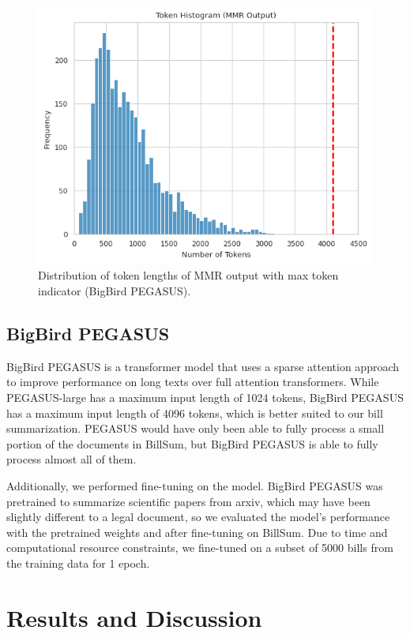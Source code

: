 \documentclass[11pt]{article}
\begin{document}
\begin{figure}[ht]
  \centering
  \includegraphics[width=\columnwidth]{token_distr_shortened.png}  %
  \caption{Distribution of token lengths of MMR output with max token indicator (BigBird PEGASUS).}
  \label{fig:token_distr_short}
\end{figure}

\subsection{BigBird PEGASUS}

BigBird PEGASUS is a transformer model that uses a sparse attention approach to improve performance on long texts over full attention transformers. While PEGASUS-large has a maximum input length of 1024 tokens, BigBird PEGASUS has a maximum input length of 4096 tokens, which is better suited to our bill summarization. PEGASUS would have only been able to fully process a small portion of the documents in BillSum, but BigBird PEGASUS is able to fully process almost all of them. 

Additionally, we performed fine-tuning on the model. BigBird PEGASUS was pretrained to summarize scientific papers from arxiv, which may have been slightly different to a legal document, so we evaluated the model's performance with the pretrained weights and after fine-tuning on BillSum. Due to time and computational resource constraints, we fine-tuned on a subset of 5000 bills from the training data for 1 epoch.

\section{Results and Discussion}
\end{document}
